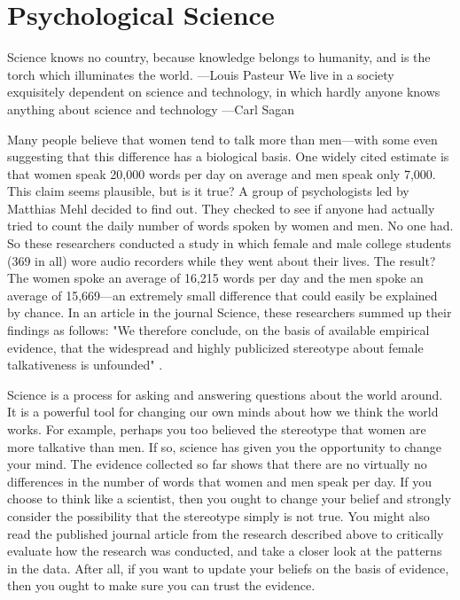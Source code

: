 \chapter{Psychological Science}

Science knows no country, because knowledge belongs to humanity, and is the torch which illuminates the world.
---Louis Pasteur
We live in a society exquisitely dependent on science and technology, in which hardly anyone knows anything about science and technology
---Carl Sagan



Many people believe that women tend to talk more than men---with some even suggesting that this difference has a biological basis. One widely cited estimate is that women speak 20,000 words per day on average and men speak only 7,000. This claim seems plausible, but is it true? A group of psychologists led by Matthias Mehl decided to find out. They checked to see if anyone had actually tried to count the daily number of words spoken by women and men. No one had. So these researchers conducted a study in which female and male college students (369 in all) wore audio recorders while they went about their lives. The result? The women spoke an average of 16,215 words per day and the men spoke an average of 15,669---an extremely small difference that could easily be explained by chance. In an article in the journal Science, these researchers summed up their findings as follows: "We therefore conclude, on the basis of available empirical evidence, that the widespread and highly publicized stereotype about female talkativeness is unfounded" \citep{mehl_are_2007}.

Science is a process for asking and answering questions about the world around. It is a powerful tool for changing our own minds about how we think the world works. For example, perhaps you too believed the stereotype that women are more talkative than men. If so, science has given you the opportunity to change your mind. The evidence collected so far shows that there are no virtually no differences in the number of words that women and men speak per day. If you choose to think like a scientist, then you ought to change your belief and strongly consider the possibility that the stereotype simply is not true. You might also read the published journal article from the research described above to critically evaluate how the research was conducted, and take a closer look at the patterns in the data. After all, if you want to update your beliefs on the basis of evidence, then you ought to make sure you can trust the evidence.

